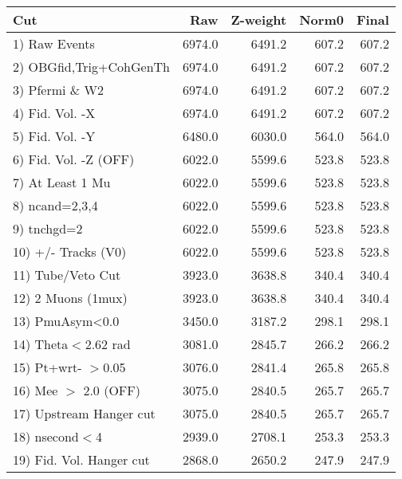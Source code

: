  \begin{table}[h!]\centering
 \begin{tabular}{||l||r|r|r|r||}
 \hline
 \hline
 Cut & Raw & Z-weight & Norm0 & Final \\
 \hline
  1) Raw Events           &      6974.0 &      6491.2 &       607.2 &       607.2 \\
  2) OBGfid,Trig+CohGenTh &      6974.0 &      6491.2 &       607.2 &       607.2 \\
  3) Pfermi \& W2         &      6974.0 &      6491.2 &       607.2 &       607.2 \\
  4) Fid. Vol. -X         &      6974.0 &      6491.2 &       607.2 &       607.2 \\
  5) Fid. Vol. -Y         &      6480.0 &      6030.0 &       564.0 &       564.0 \\
  6) Fid. Vol. -Z (OFF)   &      6022.0 &      5599.6 &       523.8 &       523.8 \\
  7) At Least 1 Mu        &      6022.0 &      5599.6 &       523.8 &       523.8 \\
  8) ncand=2,3,4          &      6022.0 &      5599.6 &       523.8 &       523.8 \\
  9) tnchgd=2             &      6022.0 &      5599.6 &       523.8 &       523.8 \\
 10) +/- Tracks (V0)      &      6022.0 &      5599.6 &       523.8 &       523.8 \\
 11) Tube/Veto Cut        &      3923.0 &      3638.8 &       340.4 &       340.4 \\
 12) 2 Muons (1mux)       &      3923.0 &      3638.8 &       340.4 &       340.4 \\
 13) PmuAsym<0.0          &      3450.0 &      3187.2 &       298.1 &       298.1 \\
 14) Theta$<$2.62 rad     &      3081.0 &      2845.7 &       266.2 &       266.2 \\
 15) Pt+wrt- $>$0.05      &      3076.0 &      2841.4 &       265.8 &       265.8 \\
 16) Mee $>$ 2.0  (OFF)   &      3075.0 &      2840.5 &       265.7 &       265.7 \\
 17) Upstream Hanger cut  &      3075.0 &      2840.5 &       265.7 &       265.7 \\
 18) nsecond$<$4          &      2939.0 &      2708.1 &       253.3 &       253.3 \\
 19) Fid. Vol. Hanger cut &      2868.0 &      2650.2 &       247.9 &       247.9 \\

\end{tabular}
\end{table}
